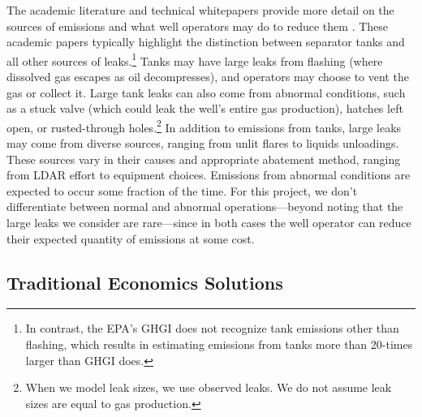 The academic literature and technical whitepapers provide more detail on the sources of emissions and what well operators may do to reduce them
\parencite{%
Lyon/Alvarez/Zavala-Araiza/Brandt/Jackson/Hamburg:2016,
Rutherford/etal:2021,
Ravikumar/etal:2020,
Robertson/etal:2020,
ICF-abatement:2014,
}.
These academic papers typically highlight the distinction between separator tanks and all other sources of leaks.\footnote{%
In contrast, the \gls{EPA}'s \gls{GHGI} does not recognize tank emissions other than flashing, which results in \textcite{Rutherford/etal:2021} estimating emissions from tanks more than 20-times larger than \gls{GHGI} does.
}
Tanks may have large leaks from flashing (where dissolved gas escapes as oil decompresses), and operators may choose to vent the gas or collect it.
Large tank leaks can also come from abnormal conditions, such as a stuck valve (which could leak the well's entire gas production), hatches left open, or rusted-through holes.\footnote{%
When we model leak sizes, we use observed leaks.
We do not assume leak sizes are equal to gas production.
}
In addition to emissions from tanks, large leaks may come from diverse sources, ranging from unlit flares to liquids unloadings.
These sources vary in their causes and appropriate abatement method, ranging from \gls{LDAR} effort to equipment choices.
Emissions from abnormal conditions are expected to occur some fraction of the time.
For this project, we don't differentiate between normal and abnormal operations---beyond noting that the large leaks we consider are rare---since in both cases the well operator can reduce their expected quantity of emissions at some cost.


\subsection{Traditional Economics Solutions}
\label{sec:traditional-economics-solutions}

